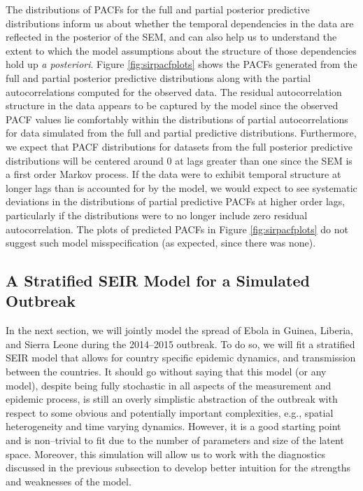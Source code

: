The distributions of PACFs for the full and partial posterior predictive distributions inform us about whether the temporal dependencies in the data are reflected in the posterior of the SEM, and can also help us to understand the extent to which the model assumptions about the structure of those dependencies hold up \textit{a posteriori}. Figure \ref{fig:sirpacfplots} shows the PACFs generated from the full and partial posterior predictive distributions along with the partial autocorrelations computed for the observed data. The residual autocorrelation structure in the data appears to be captured by the model since the observed PACF values lie comfortably within the distributions of partial autocorrelations for data simulated from the full and partial predictive distributions. Furthermore, we expect that PACF distributions for datasets from the full posterior predictive distributions will be centered around 0 at lags greater than one since the SEM is a first order Markov process. If the data were to exhibit temporal structure at longer lags than is accounted for by the model, we would expect to see systematic deviations in the distributions of partial predictive PACFs at higher order lags, particularly if the distributions were to no longer include zero residual autocorrelation. The plots of predicted PACFs in Figure \ref{fig:sirpacfplots} do not suggest such model misspecification (as expected, since there was none). 

\subsection{A Stratified SEIR Model for a Simulated Outbreak}
\label{subsec:ebola_synth}

In the next section, we will jointly model the spread of Ebola in Guinea, Liberia, and Sierra Leone during the 2014--2015 outbreak. To do so, we will fit a stratified SEIR model that allows for country specific epidemic dynamics, and transmission between the countries. It should go without saying that this model (or any model), despite being fully stochastic in all aspects of the measurement and epidemic process, is still an overly simplistic abstraction of the outbreak with respect to some obvious and potentially important complexities, e.g., spatial heterogeneity and time varying dynamics. However, it is a good starting point and is non--trivial to fit due to the number of parameters and size of the latent space. Moreover, this simulation will allow us to work with the diagnostics discussed in the previous subsection to develop better intuition for the strengths and weaknesses of the model. 

